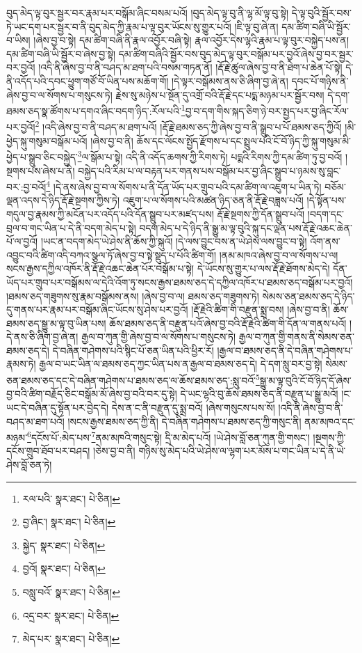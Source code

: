 བུད་མེད་ལྟ་བུར་སྦྱར་བར་རྣམ་པར་བསྒོམ་ཞིང་བསམ་པའོ། །བུད་མེད་ལྟ་བུ་ནི་ལྷ་མོ་ལྟ་བུ་སྟེ། དེ་ལྟ་བུའི་སྦྱོར་བས་ཏེ་ཡང་དག་པར་སྦྱར་བ་ནི་བུད་མེད་ཀྱི་རྣམ་པ་ལྟ་བུར་ཡོངས་སུ་གྱུར་པའོ། །ཇི་ལྟ་བུ་ཞེ་ན། དམ་ཚིག་བཞི་ཡི་སྦྱོར་བ་ཡིས། །ཞེས་བྱ་བ་སྟེ། དམ་ཚིག་བཞི་ནི་རྣལ་འབྱོར་བཞི་སྟེ། རྣལ་འབྱོར་དེས་ལྷའི་རྣམ་པ་ལྟ་བུར་བསྐྱེད་པས་ན། དམ་ཚིག་བཞི་ཡི་སྦྱོར་བ་ཞེས་བྱ་སྟེ། དམ་ཚིག་བཞིའི་སྦྱོར་བས་བུད་མེད་ལྟ་བུར་བསྒོམ་པར་བྱའོ་ཞེས་བྱ་བར་སྦྱར་བར་བྱའོ། །འདི་ནི་ཞེས་བྱ་བ་ནི་བཤད་མ་ཐག་པའི་བསམ་གཏན་ནོ། །རྡོ་རྗེ་ཚུལ་ཞེས་བྱ་བ་ནི་ཐེག་པ་ཆེན་པོ་སྟེ། དེ་ནི་འདོད་པའི་དབང་ཕྱུག་གཙོ་བོ་ཡིན་པས་མཆོག་གོ། །དེ་ལྟར་བསྒོམས་ནས་ཅི་ཞིག་བྱ་ཞེ་ན། དབང་པོ་གཉིས་ནི་ཞེས་བྱ་བ་ལ་སོགས་པ་གསུངས་ཏེ། རྗེས་སུ་མཉེས་པ་སྔོན་དུ་འགྲོ་བའི་རྡོ་རྗེ་དང་པདྨ་མཉམ་པར་སྦྱོར་བས། དེ་དག་ཐམས་ཅད་སྣ་ཚོགས་པ་དགའ་ཞིང་བདག་ཉིད་:རོལ་པའི་\footnote{རལ་པའི་  སྣར་ཐང་།  པེ་ཅིན། }བྱ་བ་དག་གིས་སྐད་ཅིག་ཉེ་བར་སྤྱད་པར་བྱ་ཞིང་རོལ་པར་བྱའོ།\footnote{བྱ་ཞིང་།  སྣར་ཐང་།  པེ་ཅིན། } །འདི་ཞེས་བྱ་བ་ནི་བཤད་མ་ཐག་པའོ། །རྡོ་རྗེ་ཐམས་ཅད་ཀྱི་ཞེས་བྱ་བ་ནི་སྒྲུབ་པ་པོ་ཐམས་ཅད་ཀྱིའོ། །མི་ཕྱེད་སྐུ་གསུམ་བསྒོམ་པའོ། །ཞེས་བྱ་བ་ནི། ཆོས་དང་ལོངས་སྤྱོད་རྫོགས་པ་དང་སྤྲུལ་པའི་ངོ་བོ་ཉིད་ཀྱི་སྐུ་གསུམ་མི་ཕྱེད་པ་སྒྲུབ་ཅིང་བསྐྱེད་\footnote{སྐྱེད་  སྣར་ཐང་།  པེ་ཅིན། }ལ་སྒོམ་པ་སྟེ། འདི་ནི་འདོད་ཆགས་ཀྱི་རིགས་ཏེ། པདྨའི་རིགས་ཀྱི་དམ་ཚིག་ཏུ་བྱ་བའོ། །སྔགས་པས་ཞེས་པ་ནི། བསྐྱེད་པའི་རིམ་པ་ལ་བརྟན་པར་གནས་པས་བསྒོམ་པར་བྱ་ཞིང་སྒྲུབ་པ་ཉམས་སུ་བླང་བར་:བྱ་བའོ།\footnote{བྱའོ།  སྣར་ཐང་།  པེ་ཅིན། } །དེ་ནས་ཞེས་བྱ་བ་ལ་སོགས་པ་ནི་དོན་ཡོད་པར་གྲུབ་པའི་དམ་ཚིག་ལ་འཇུག་པ་ཡིན་ཏེ། བཅོམ་ལྡན་འདས་དེ་ཉིད་རྡོ་རྗེ་སྔགས་ཀྱིས་ཏེ། འཇུག་པ་ལ་སོགས་པའི་མཚན་ཉིད་ཅན་ནི་རྡོ་རྗེ་བཟླས་པའོ། །དེ་སྟོན་པས་གདུལ་བྱ་རྣམས་ཀྱི་མངོན་པར་འདོད་པའི་དོན་སྒྲུབ་པར་མཛད་པས། རྡོ་རྗེ་སྔགས་ཀྱི་དོན་སྒྲུབ་པའོ། །བདག་དང་བྲལ་བ་གང་ཡིན་པ་དེ་ནི་བདག་མེད་པ་སྟེ། བདག་མེད་པ་དེ་ཉིད་ནི་སྒྱུ་མ་ལྟ་བུའི་སྐུ་དང་ལྡན་པས་རྡོ་རྗེ་འཆང་ཆེན་པོ་ལ་བྱའོ། །ཡང་ན་བདག་མེད་ཡེ་ཤེས་ནི་ཆོས་ཀྱི་སྐུའོ། །དེ་ལས་བྱུང་བས་ན་ཡེ་ཤེས་ལས་བྱུང་བ་སྟེ། འོག་ནས་འབྱུང་བའི་ཚིག་འདི་བཀའ་སྩལ་ཏོ་ཞེས་བྱ་བ་སྟེ་སྡུད་པ་པོའི་ཚིག་གོ། །ནམ་མཁའ་ཞེས་བྱ་བ་ལ་སོགས་པ་ལ། སངས་རྒྱས་དཀྱིལ་འཁོར་ནི་རྡོ་རྗེ་འཆང་ཆེན་པོར་བསྒོམ་པ་སྟེ། དེ་ཡོངས་སུ་གྱུར་པ་ལས་རྡོ་རྗེ་ཐོགས་མེད་དེ། དོན་ཡོད་པར་གྲུབ་པར་བསྒོམས་ལ་དེའི་འོག་ཏུ་སངས་རྒྱས་ཐམས་ཅད་དེ་དཀྱིལ་འཁོར་པ་ཐམས་ཅད་བསྒོམ་པར་བྱའོ། །ཐམས་ཅད་གཟུགས་སུ་རྣམ་བསྒོམས་ནས། །ཞེས་བྱ་བ་ལ། ཐམས་ཅད་གཟུགས་ཏེ། སེམས་ཅན་ཐམས་ཅད་དེ་ཉིད་དུ་གནས་པར་རྣམ་པར་བསྒོམ་ཞིང་ཡོངས་སུ་ཤེས་པར་བྱའོ། །རྡོ་རྗེའི་ཚིག་གི་བརྫུན་སྨྲ་བས། །ཞེས་བྱ་བ་ནི། ཆོས་ཐམས་ཅད་སྒྱུ་མ་ལྟ་བུ་ཡིན་པས། ཆོས་ཐམས་ཅད་ནི་བརྫུན་པའོ་ཞེས་བྱ་བའི་རྡོ་རྗེའི་ཚིག་གི་དོན་ལ་གནས་པའོ། །དེ་ནས་ཅི་ཞིག་བྱ་ཞེ་ན། རྒྱལ་བ་ཀུན་གྱི་ཞེས་བྱ་བ་ལ་སོགས་པ་གསུངས་ཏེ། རྒྱལ་བ་ཀུན་གྱི་གནས་ནི་སེམས་ཅན་ཐམས་ཅད་དེ། དེ་བཞིན་གཤེགས་པའི་སྙིང་པོ་ཅན་ཡིན་པའི་ཕྱིར་རོ། །རྒྱལ་བ་ཐམས་ཅད་ནི་དེ་བཞིན་གཤེགས་པ་རྣམས་ཏེ། རྒྱལ་བ་ཡང་ཡིན་ལ་ཐམས་ཅད་ཀྱང་ཡིན་པས་ན་རྒྱལ་བ་ཐམས་ཅད་དེ། དེ་དག་སླུ་བར་བྱ་སྟེ། སེམས་ཅན་ཐམས་ཅད་དང་དེ་བཞིན་གཤེགས་པ་ཐམས་ཅད་ལ་ཆོས་ཐམས་ཅད་:སླུ་བའོ་\footnote{བསླུ་བའོ་  སྣར་ཐང་།  པེ་ཅིན། }སྒྱུ་མ་ལྟ་བུའི་ངོ་བོ་ཉིད་དོ་ཞེས་བྱ་བའི་ཚིག་བརྗོད་ཅིང་བསྒོམ་མོ་ཞེས་བྱ་བའི་བར་དུ་སྟེ། དེ་ཡང་ལྷའི་བུ་ཆོས་ཐམས་ཅད་ནི་བརྫུན་པ་སྒྱུ་མའོ། །ང་ཡང་དེ་བཞིན་དུ་སྟོན་པར་བྱེད་དེ། དེས་ན་ང་ནི་བརྫུན་དུ་སྨྲ་བའོ། །ཞེས་གསུངས་པས་སོ། །འདི་ནི་ཞེས་བྱ་བ་ནི་བཤད་མ་ཐག་པའོ། །སངས་རྒྱས་ཐམས་ཅད་ཀྱི་ནི། དེ་བཞིན་གཤེགས་པ་ཐམས་ཅད་ཀྱི་གསུང་ནི། ནམ་མཁའ་དང་མཉམ་\footnote{འདྲ་བར་  སྣར་ཐང་།  པེ་ཅིན། }དངོས་པོ་:མེད་པས་\footnote{མེད་པར་  སྣར་ཐང་།  པེ་ཅིན། }ནམ་མཁའི་གསུང་སྟེ། དྲི་མ་མེད་པའོ། །ཡེ་ཤེས་བློ་ཅན་ཀུན་གྱི་གསང་། །སྔགས་ཀྱི་དངོས་གྲུབ་ཐོབ་པར་བཤད། །ཅེས་བྱ་བ་ནི། གཉིས་སུ་མེད་པའི་ཡེ་ཤེས་ལ་ལྷག་པར་མོས་པ་གང་ཡིན་པ་དེ་ནི་ཡེ་ཤེས་བློ་ཅན་ཏེ། 